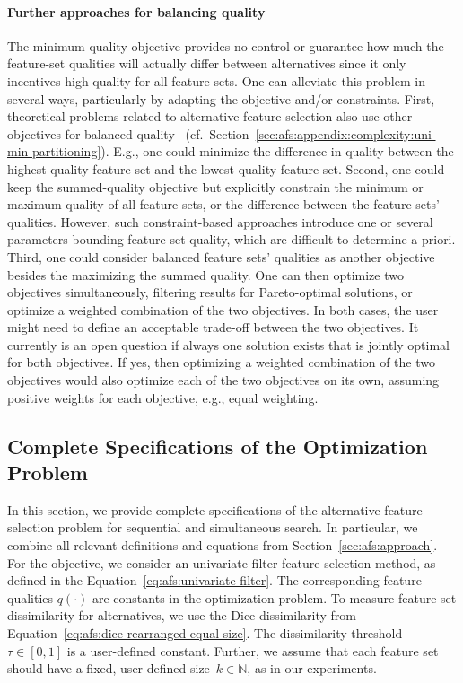 \documentclass{article}
\theoremstyle{definition}
\begin{document}
\paragraph{Further approaches for balancing quality}

The minimum-quality objective provides no control or guarantee how much the feature-set qualities will actually differ between alternatives since it only incentives high quality for all feature sets.
One can alleviate this problem in several ways, particularly by adapting the objective and/or constraints.
First, theoretical problems related to alternative feature selection also use other objectives for balanced quality~\cite{korf2010objective, lawrinenko2017identical} (cf.~Section~\ref{sec:afs:appendix:complexity:uni-min-partitioning}).
E.g., one could minimize the difference in quality between the highest-quality feature set and the lowest-quality feature set.
Second, one could keep the summed-quality objective but explicitly constrain the minimum or maximum quality of all feature sets, or the difference between the feature sets' qualities.
However, such constraint-based approaches introduce one or several parameters bounding feature-set quality, which are difficult to determine a priori.
Third, one could consider balanced feature sets' qualities as another objective besides the maximizing the summed quality.
One can then optimize two objectives simultaneously, filtering results for Pareto-optimal solutions, or optimize a weighted combination of the two objectives.
In both cases, the user might need to define an acceptable trade-off between the two objectives.
It currently is an open question if always one solution exists that is jointly optimal for both objectives.
If yes, then optimizing a weighted combination of the two objectives would also optimize each of the two objectives on its own, assuming positive weights for each objective, e.g., equal weighting.

\subsection{Complete Specifications of the Optimization Problem}
\label{sec:afs:appendix:complete-optimization-problem}

In this section, we provide complete specifications of the alternative-feature-selection problem for sequential and simultaneous search.
In particular, we combine all relevant definitions and equations from Section~\ref{sec:afs:approach}.
For the objective, we consider an univariate filter feature-selection method, as defined in the Equation~\ref{eq:afs:univariate-filter}.
The corresponding feature qualities $q(\cdot)$ are constants in the optimization problem.
To measure feature-set dissimilarity for alternatives, we use the Dice dissimilarity from Equation~\ref{eq:afs:dice-rearranged-equal-size}.
The dissimilarity threshold~$\tau \in [0,1]$ is a user-defined constant.
Further, we assume that each feature set should have a fixed, user-defined size~$k \in \mathbb{N}$, as in our experiments.
\end{document}
